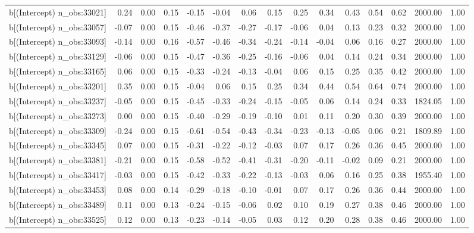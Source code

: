 \begin{table}[ht]
\begin{tabular}{rrrrrrrrrrrrrrr}
  b[(Intercept) n\_obs:33021] & 0.24 & 0.00 & 0.15 & -0.15 & -0.04 & 0.06 & 0.15 & 0.25 & 0.34 & 0.43 & 0.54 & 0.62 & 2000.00 & 1.00 \\ 
  b[(Intercept) n\_obs:33057] & -0.07 & 0.00 & 0.15 & -0.46 & -0.37 & -0.27 & -0.17 & -0.06 & 0.04 & 0.13 & 0.23 & 0.32 & 2000.00 & 1.00 \\ 
  b[(Intercept) n\_obs:33093] & -0.14 & 0.00 & 0.16 & -0.57 & -0.46 & -0.34 & -0.24 & -0.14 & -0.04 & 0.06 & 0.16 & 0.27 & 2000.00 & 1.00 \\ 
  b[(Intercept) n\_obs:33129] & -0.06 & 0.00 & 0.15 & -0.47 & -0.36 & -0.25 & -0.16 & -0.06 & 0.04 & 0.14 & 0.24 & 0.34 & 2000.00 & 1.00 \\ 
  b[(Intercept) n\_obs:33165] & 0.06 & 0.00 & 0.15 & -0.33 & -0.24 & -0.13 & -0.04 & 0.06 & 0.15 & 0.25 & 0.35 & 0.42 & 2000.00 & 1.00 \\ 
  b[(Intercept) n\_obs:33201] & 0.35 & 0.00 & 0.15 & -0.04 & 0.06 & 0.15 & 0.25 & 0.34 & 0.44 & 0.54 & 0.64 & 0.74 & 2000.00 & 1.00 \\ 
  b[(Intercept) n\_obs:33237] & -0.05 & 0.00 & 0.15 & -0.45 & -0.33 & -0.24 & -0.15 & -0.05 & 0.06 & 0.14 & 0.24 & 0.33 & 1824.05 & 1.00 \\ 
  b[(Intercept) n\_obs:33273] & 0.00 & 0.00 & 0.15 & -0.40 & -0.29 & -0.19 & -0.10 & 0.01 & 0.11 & 0.20 & 0.30 & 0.39 & 2000.00 & 1.00 \\ 
  b[(Intercept) n\_obs:33309] & -0.24 & 0.00 & 0.15 & -0.61 & -0.54 & -0.43 & -0.34 & -0.23 & -0.13 & -0.05 & 0.06 & 0.21 & 1809.89 & 1.00 \\ 
  b[(Intercept) n\_obs:33345] & 0.07 & 0.00 & 0.15 & -0.31 & -0.22 & -0.12 & -0.03 & 0.07 & 0.17 & 0.26 & 0.36 & 0.45 & 2000.00 & 1.00 \\ 
  b[(Intercept) n\_obs:33381] & -0.21 & 0.00 & 0.15 & -0.58 & -0.52 & -0.41 & -0.31 & -0.20 & -0.11 & -0.02 & 0.09 & 0.21 & 2000.00 & 1.00 \\ 
  b[(Intercept) n\_obs:33417] & -0.03 & 0.00 & 0.15 & -0.42 & -0.33 & -0.22 & -0.13 & -0.03 & 0.06 & 0.16 & 0.25 & 0.38 & 1955.40 & 1.00 \\ 
  b[(Intercept) n\_obs:33453] & 0.08 & 0.00 & 0.14 & -0.29 & -0.18 & -0.10 & -0.01 & 0.07 & 0.17 & 0.26 & 0.36 & 0.44 & 2000.00 & 1.00 \\ 
  b[(Intercept) n\_obs:33489] & 0.11 & 0.00 & 0.13 & -0.24 & -0.15 & -0.06 & 0.02 & 0.10 & 0.19 & 0.27 & 0.38 & 0.46 & 2000.00 & 1.00 \\ 
  b[(Intercept) n\_obs:33525] & 0.12 & 0.00 & 0.13 & -0.23 & -0.14 & -0.05 & 0.03 & 0.12 & 0.20 & 0.28 & 0.38 & 0.46 & 2000.00 & 1.00 \\ 

\end{tabular}
\end{table}
